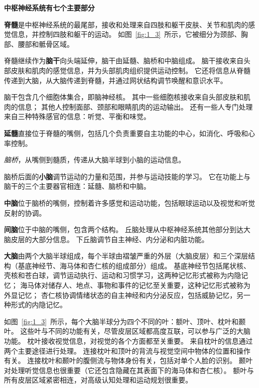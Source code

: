 \begin{proposition}[中枢神经系统的解剖学组织] \label{box:1_2}
	\textbf{中枢神经系统有七个主要部分}
	
	\quad \quad \textbf{脊髓}是中枢神经系统的最尾部，接收和处理来自四肢和躯干皮肤、关节和肌肉的感觉信息，并控制四肢和躯干的运动。
	如图~\ref{fig:1_3}~所示，它被细分为颈部、胸部、腰部和骶骨区域。
	
	\quad \quad 脊髓继续作为\textbf{脑干}向头端延伸，脑干由延髓、脑桥和中脑组成。
	脑干接收来自头部皮肤和肌肉的感觉信息，并为头部肌肉组织提供运动控制。
	它还将信息从脊髓传递到大脑，从大脑传递到脊髓，并通过网状结构调节唤醒和意识水平。
	
	\quad \quad 脑干包含几个细胞体集合，即脑神经核。
	其中一些细胞核接收来自头部皮肤和肌肉的信息；
	其他人控制面部、颈部和眼睛肌肉的运动输出。
	还有一些人专门处理来自三种特殊感官的信息：听觉、平衡和味觉。
	
	\quad \quad \textbf{延髓}直接位于脊髓的嘴侧，包括几个负责重要自主功能的中心，如消化、呼吸和心率控制。
	
	\quad \quad \textit{脑桥}，从嘴侧到髓质，传递从大脑半球到小脑的运动信息。
	
	\quad \quad 脑桥后面的\textbf{小脑}调节运动的力量和范围，并参与运动技能的学习。
	它在功能上与脑干的三个主要器官相连：延髓、脑桥和中脑。
	
	\quad \quad \textbf{中脑}位于脑桥的嘴侧，控制着许多感觉和运动功能，包括眼球运动以及视觉和听觉反射的协调。
	
	\quad \quad \textbf{间脑}位于中脑的嘴侧，包含两个结构。
	丘脑处理从中枢神经系统其他部分到达大脑皮层的大部分信息。
	下丘脑调节自主神经、内分泌和内脏功能。
	
	\quad \quad \textbf{大脑}由两个大脑半球组成，每个半球由褶皱严重的外层（大脑皮层）和三个深层结构（基底神经节、海马体和杏仁核的组成部分）组成。
	基底神经节包括尾状核、壳核和苍白球，调节运动执行、运动和习惯学习，这两种记忆形式被称为内隐记忆；
	海马体对储存人、地点、事物和事件的记忆至关重要，这种记忆形式被称为外显记忆；
	杏仁核协调情绪状态的自主神经和内分泌反应，包括威胁记忆，另一种形式的内隐记忆。
	
	\quad \quad 如图~\ref{fig:1_3}~所示，每个大脑半球分为四个不同的叶：额叶、顶叶、枕叶和颞叶。
	这些叶与不同的功能有关，尽管皮层区域都高度互联，可以参与广泛的大脑功能。
	枕叶接收视觉信息，对视觉的各个方面都至关重要。
	来自枕叶的信息通过两个主要途径进行处理。
	连接枕叶和顶叶的背流与视觉空间中物体的位置和操作有关。
	连接枕叶和颞叶的腹侧流与物体身份有关，包括对单个人脸的识别。
	颞叶对处理听觉信息也很重要（它还包含隐藏在其表面下的海马体和杏仁核）。
	额叶与所有皮层区域紧密相连，对高级认知处理和运动规划很重要。
	

\end{proposition}

